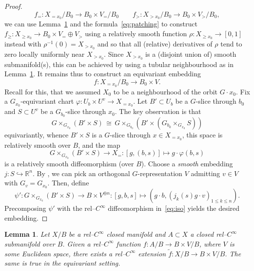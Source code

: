 \documentclass[11pt,psamsfonts, oneside, reqno]{amsart}
\newcommand{\hkra}{\hookrightarrow}
\newcommand{\sub}{\subset}%
\newcommand{\inv}{^{-1}}
\newcommand{\cl}{\colon}
\newcommand{\bR}{\mathbb{R}}
\newcommand{\wt}{\widetilde}
\newtheorem{lemma}[theorem]{Lemma}
\theoremstyle{definition}
\theoremstyle{remark}
\numberwithin{equation}{section}
\begin{document}
\begin{proof}
	\begin{equation}\label{eq:building-blocks-vertical} 
		f_= \cl X_{ = x_0}/B_{0} \to B_{0}\times V_=/B_{0}  \qquad f_{>} \cl X_{ > x_0}/B_0 \to B_0\times V_>/B_0,
	\end{equation}
we can use Lemma~\ref{lem:extending-rel-smoothly} and the formula~\eqref{eq:patching} to construct $f_{\ge} \cl X_{\ge x_0}\to B_0\times V_{=}\oplus V_{>}$ using a relatively smooth function $\rho \cl X_{\ge x_0}\to [0,1]$ instead with $\rho\inv(0) = X_{> x_0}$ and so that all (relative) derivatives of $\rho$ tend to zero locally uniformly near $X_{> x_0}$. Since $X_{> x_0}$ is a (disjoint union of) smooth submanifold(s), this can be achieved by using a tubular neighbourhood as in Lemma~\ref{lem:extending-rel-smoothly}. It remains thus to construct an equivariant embedding
\begin{equation*}\label{}
	f \cl X_{= x_0}/B_0\to B_0 \times V.
 \end{equation*}
Recall for this, that we assumed $X_0$ to be a neighbourhood of the orbit $G\cdot x_0$. Fix a $G_{x_0}$-equivariant chart $\varphi \cl U_b \times U^v \to X_{=x_0}$. Let $B' \sub U_b$ be a $G$-slice through $b_0$ and $S \sub U^v$ be a $G_{b_0}$-slice through $x_0$. The key observation is that 
\begin{equation}\label{eq:iso} 
	G\times_{G_{x_0}} (B'\times S)\,\cong\, G\times_{G_{b_0}}(B'\times (G_{b_0}\times_{G_{x_0}}S))
\end{equation}
equivariantly, whence $B'\times S$ is a $G$-slice through $x \in X_{=x_0}$, this space is relatively smooth over $B$, and the map 
\begin{equation*}\label{} 
G\times_{G_{x_0}} (B'\times S)\to  X_= : [g,(b,s)]\mapsto g\cdot \varphi(b,s)
\end{equation*}
is a relatively smooth diffeomorphism (over $B$). Choose a \emph{smooth} embedding $j \cl S\hkra \bR^n$. By \cite[Lemma~5.2]{Mos57}, we can pick an orthogonal $G$-representation $V$ admitting $v \in V$ with $G_v = G_{x_0}$. Then, define 
\begin{equation}\label{} 
	\psi' \cl G\times_{G_{x_0}} (B'\times S) \to B\times V^{\oplus n} : [g,b,s]\mapsto (g\cdot b,(j_k(s)g\cdot v)_{1 \leq k \le n}).
\end{equation}
Precomposing $\psi'$ with the rel--$C^\infty$ diffeomorphism in~\eqref{eq:iso} yields the desired embedding.
\end{proof}


\begin{lemma}\label{lem:extending-rel-smoothly} Let $X/B$ be a rel--$C^\infty$ closed manifold and $A\sub X$ a closed rel--$C^\infty$ submanifold over $B$. Given a rel--$C^\infty$ function $f \cl A/B\to B\times V/B$, where $V$ is some Euclidean space, there exists a rel--$C^\infty$ extension $\wt f\cl X/B\to B\times V/B$. The same is true in the equivariant setting.
\end{lemma}
\end{document}
